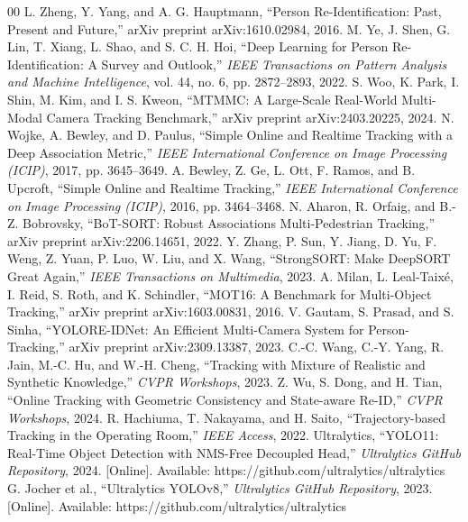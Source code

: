 \documentclass[conference]{IEEEtran}
\begin{document}

\begin{thebibliography}{00}
 L. Zheng, Y. Yang, and A. G. Hauptmann, ``Person Re-Identification: Past, Present and Future,'' arXiv preprint arXiv:1610.02984, 2016.
 M. Ye, J. Shen, G. Lin, T. Xiang, L. Shao, and S. C. H. Hoi, ``Deep Learning for Person Re-Identification: A Survey and Outlook,'' \textit{IEEE Transactions on Pattern Analysis and Machine Intelligence}, vol. 44, no. 6, pp. 2872--2893, 2022.
 S. Woo, K. Park, I. Shin, M. Kim, and I. S. Kweon, ``MTMMC: A Large-Scale Real-World Multi-Modal Camera Tracking Benchmark,'' arXiv preprint arXiv:2403.20225, 2024.
 N. Wojke, A. Bewley, and D. Paulus, ``Simple Online and Realtime Tracking with a Deep Association Metric,'' \textit{IEEE International Conference on Image Processing (ICIP)}, 2017, pp. 3645--3649.
 A. Bewley, Z. Ge, L. Ott, F. Ramos, and B. Upcroft, ``Simple Online and Realtime Tracking,'' \textit{IEEE International Conference on Image Processing (ICIP)}, 2016, pp. 3464--3468.
 N. Aharon, R. Orfaig, and B.-Z. Bobrovsky, ``BoT-SORT: Robust Associations Multi-Pedestrian Tracking,'' arXiv preprint arXiv:2206.14651, 2022.
 Y. Zhang, P. Sun, Y. Jiang, D. Yu, F. Weng, Z. Yuan, P. Luo, W. Liu, and X. Wang, ``StrongSORT: Make DeepSORT Great Again,'' \textit{IEEE Transactions on Multimedia}, 2023.
 A. Milan, L. Leal-Taix\'{e}, I. Reid, S. Roth, and K. Schindler, ``MOT16: A Benchmark for Multi-Object Tracking,'' arXiv preprint arXiv:1603.00831, 2016.
 V. Gautam, S. Prasad, and S. Sinha, ``YOLORE-IDNet: An Efficient Multi-Camera System for Person-Tracking,'' arXiv preprint arXiv:2309.13387, 2023.
 C.-C. Wang, C.-Y. Yang, R. Jain, M.-C. Hu, and W.-H. Cheng, ``Tracking with Mixture of Realistic and Synthetic Knowledge,'' \textit{CVPR Workshops}, 2023.
 Z. Wu, S. Dong, and H. Tian, ``Online Tracking with Geometric Consistency and State-aware Re-ID,'' \textit{CVPR Workshops}, 2024.
 R. Hachiuma, T. Nakayama, and H. Saito, ``Trajectory-based Tracking in the Operating Room,'' \textit{IEEE Access}, 2022.
 Ultralytics, ``YOLO11: Real-Time Object Detection with NMS-Free Decoupled Head,'' \textit{Ultralytics GitHub Repository}, 2024. [Online]. Available: https://github.com/ultralytics/ultralytics
 G. Jocher et al., ``Ultralytics YOLOv8,'' \textit{Ultralytics GitHub Repository}, 2023. [Online]. Available: https://github.com/ultralytics/ultralytics

\end{thebibliography}
\end{document}
